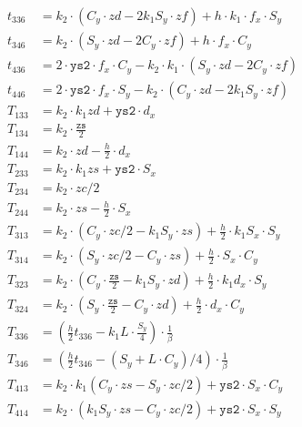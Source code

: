 \documentclass{cern-art} %
\begin{document}
\[
\begin{array}{rl}
     t_{336} &= {k_2} {\cdot} \left({C_y}{\cdot}zd - 2 {k_1}{S_y}{\cdot}zf\right) + h {\cdot} {k_1} {\cdot} {f_x} {\cdot} {S_y}\\
     t_{346} &= {k_2} {\cdot} \left({S_y}{\cdot}zd - 2 {C_y}{\cdot}zf\right) + h {\cdot} {f_x} {\cdot} {C_y}\\
     t_{436} &= 2 {\cdot} \texttt{ys2} {\cdot} {f_x} {\cdot} {C_y} - {k_2} {\cdot} {k_1} {\cdot} \left({S_y}{\cdot}zd - 2 {C_y}{\cdot}zf\right)\\
     t_{446} &= 2 {\cdot} \texttt{ys2} {\cdot} {f_x} {\cdot} {S_y} - {k_2} {\cdot} \left({C_y}{\cdot}zd - 2 {k_1}{S_y}{\cdot}zf\right)\\
     T_{133} &= {k_2}{\cdot}{k_1}zd + \texttt{ys2}{\cdot}{d_x}\\
     T_{134} &= {k_2}{\cdot}{\frac{\texttt{zs}}{2}}\\
     T_{144} &= {k_2}{\cdot}zd - \frac{h}{2}{\cdot}{d_x}\\
     T_{233} &= {k_2}{\cdot}{k_1}zs + \texttt{ys2}{\cdot}{S_x}\\
     T_{234} &= {k_2}{\cdot}zc/2\\
     T_{244} &= {k_2}{\cdot}zs - \frac{h}{2}{\cdot}{S_x}\\
     T_{313} &= {k_2}{\cdot}\left({C_y}{\cdot} zc/2 - {k_1}{S_y}{\cdot} zs\right) + \frac{h}{2}{\cdot}{k_1}{S_x}{\cdot}{S_y}\\
     T_{314} &= {k_2}{\cdot}\left({S_y}{\cdot} zc/2 - {C_y}{\cdot}zs\right) + \frac{h}{2}{\cdot}{S_x}{\cdot}{C_y}\\
     T_{323} &= {k_2}{\cdot}\left({C_y}{\cdot} {\frac{\texttt{zs}}{2}} - {k_1}{S_y}{\cdot}zd\right) + \frac{h}{2}{\cdot}{k_1}{d_x}{\cdot}{S_y}\\
     T_{324} &= {k_2}{\cdot}\left({S_y}{\cdot} {\frac{\texttt{zs}}{2}} - {C_y}{\cdot}zd\right) + \frac{h}{2}{\cdot}{d_x}{\cdot}{C_y}\\
     T_{336} &= \left(\frac{h}{2}t_{336} - {k_1}L{\cdot}\frac{S_y}{4}\right) {\cdot} {\frac 1 \beta}\\
     T_{346} &= \left(\frac{h}{2}t_{346} - \left({S_y} + L{\cdot}{C_y}\right) / 4\right) {\cdot} {\frac 1 \beta}\\
     T_{413} &= {k_2}{\cdot}{k_1}\left({C_y}{\cdot} zs - {S_y}{\cdot} zc/2\right) + \texttt{ys2}{\cdot}{S_x}{\cdot}{C_y}\\
     T_{414} &= {k_2}{\cdot}\left({k_1}{S_y}{\cdot} zs - {C_y}{\cdot} zc/2\right) + \texttt{ys2}{\cdot}{S_x}{\cdot}{S_y}\\

\end{array}\]
\end{document}
